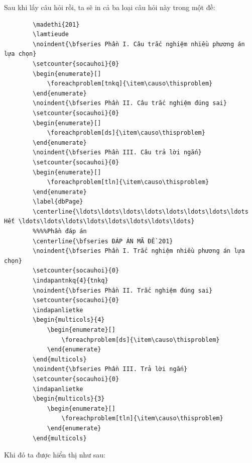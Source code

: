 	Sau khi lấy câu hỏi rồi, ta sẽ in cả ba loại câu hỏi này trong một đề:
	\begin{verbatim}
		\madethi{201}
		\lamtieude
		\noindent{\bfseries Phần I. Câu trắc nghiệm nhiều phương án lựa chọn} 
		\setcounter{socauhoi}{0}
		\begin{enumerate}[]
			\foreachproblem[tnkq]{\item\causo\thisproblem}
		\end{enumerate}
		\noindent{\bfseries Phần II. Câu trắc nghiệm đúng sai} 
		\setcounter{socauhoi}{0}
		\begin{enumerate}[]
			\foreachproblem[ds]{\item\causo\thisproblem}
		\end{enumerate}
		\noindent{\bfseries Phần III. Câu trả lời ngắn}
		\setcounter{socauhoi}{0}
		\begin{enumerate}[]
			\foreachproblem[tln]{\item\causo\thisproblem}
		\end{enumerate}
		\label{dbPage}
		\centerline{\ldots\ldots\ldots\ldots\ldots\ldots\ldots\ldots Hết \ldots\ldots\ldots\ldots\ldots\ldots\ldots\ldots}
		%%%%Phần đáp án
		\centerline{\bfseries ĐÁP ÁN MÃ ĐỀ 201}
		\noindent{\bfseries Phần I. Trắc nghiệm nhiều phương án lựa chọn}
		\setcounter{socauhoi}{0}
		\indapantnkq{4}{tnkq}
		\noindent{\bfseries Phần II. Trắc nghiệm đúng sai}
		\setcounter{socauhoi}{0}
		\indapanlietke
		\begin{multicols}{4}
			\begin{enumerate}[]
				\foreachproblem[ds]{\item\causo\thisproblem}
			\end{enumerate}
		\end{multicols}
		\noindent{\bfseries Phần III. Trả lời ngắn}
		\setcounter{socauhoi}{0}
		\indapanlietke
		\begin{multicols}{3}
			\begin{enumerate}[]
				\foreachproblem[tln]{\item\causo\thisproblem}
			\end{enumerate}
		\end{multicols}
	\end{verbatim}
	
	Khi đó ta được hiển thị như sau:
	
